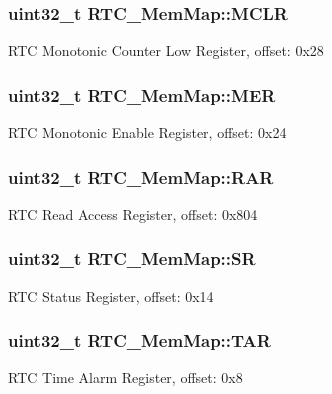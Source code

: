 \subsubsection[{M\+C\+L\+R}]{\setlength{\rightskip}{0pt plus 5cm}uint32\+\_\+t R\+T\+C\+\_\+\+Mem\+Map\+::\+M\+C\+L\+R}\label{struct_r_t_c___mem_map_a949f49a34b644f4bfa1bd05a3ed00322}
R\+T\+C Monotonic Counter Low Register, offset\+: 0x28 \hypertarget{struct_r_t_c___mem_map_a1486bb59addc84a71638decf52c7d7b6}{}
\subsubsection[{M\+E\+R}]{\setlength{\rightskip}{0pt plus 5cm}uint32\+\_\+t R\+T\+C\+\_\+\+Mem\+Map\+::\+M\+E\+R}\label{struct_r_t_c___mem_map_a1486bb59addc84a71638decf52c7d7b6}
R\+T\+C Monotonic Enable Register, offset\+: 0x24 \hypertarget{struct_r_t_c___mem_map_a59094243dc3c0849c9bc20a2a809086c}{}
\subsubsection[{R\+A\+R}]{\setlength{\rightskip}{0pt plus 5cm}uint32\+\_\+t R\+T\+C\+\_\+\+Mem\+Map\+::\+R\+A\+R}\label{struct_r_t_c___mem_map_a59094243dc3c0849c9bc20a2a809086c}
R\+T\+C Read Access Register, offset\+: 0x804 \hypertarget{struct_r_t_c___mem_map_a82faed2f609de35e3b27d5fd27ba82e2}{}
\subsubsection[{S\+R}]{\setlength{\rightskip}{0pt plus 5cm}uint32\+\_\+t R\+T\+C\+\_\+\+Mem\+Map\+::\+S\+R}\label{struct_r_t_c___mem_map_a82faed2f609de35e3b27d5fd27ba82e2}
R\+T\+C Status Register, offset\+: 0x14 \hypertarget{struct_r_t_c___mem_map_a500ab794376810b97e2b2e01658f330c}{}
\subsubsection[{T\+A\+R}]{\setlength{\rightskip}{0pt plus 5cm}uint32\+\_\+t R\+T\+C\+\_\+\+Mem\+Map\+::\+T\+A\+R}\label{struct_r_t_c___mem_map_a500ab794376810b97e2b2e01658f330c}
R\+T\+C Time Alarm Register, offset\+: 0x8 \hypertarget{struct_r_t_c___mem_map_ab816b0540497796070202cd2f5bc10ed}{}
